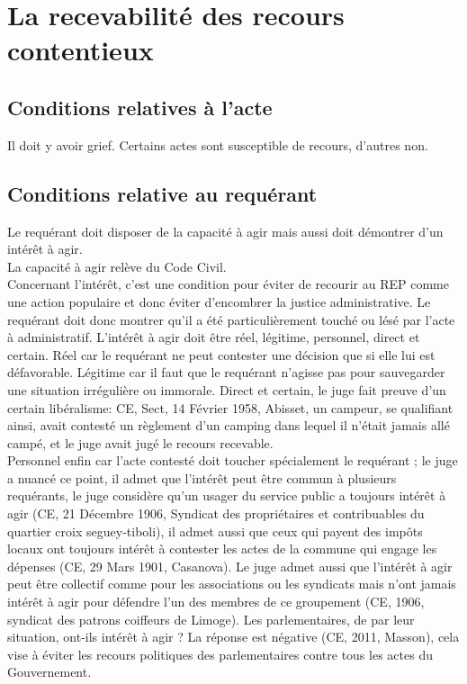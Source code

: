 \documentclass[10pt, a4paper, openany]{book}
\begin{document}
\chapter{La recevabilité des recours contentieux}

\section{Conditions relatives à l'acte}


Il doit y avoir grief. Certains actes sont susceptible de recours, d'autres non.

\section{Conditions relative au requérant}

Le requérant doit disposer de la capacité à agir mais aussi doit démontrer d'un intérêt à agir. \\
La capacité à agir relève du Code Civil. \\
Concernant l'intérêt, c'est une condition pour éviter de recourir au REP comme une action populaire et donc éviter d'encombrer la justice administrative. Le requérant doit donc montrer qu'il a été particulièrement touché ou lésé par l'acte à administratif. L'intérêt à agir doit être réel, légitime, personnel, direct et certain. Réel car le requérant ne peut contester une décision que si elle lui est défavorable. Légitime car il faut que le requérant n'agisse pas pour sauvegarder une situation irrégulière ou immorale. Direct et certain, le juge fait preuve d'un certain libéralisme: CE, Sect, 14 Février 1958, Abisset, un campeur, se qualifiant ainsi, avait contesté un règlement d'un camping dans lequel il n'était jamais allé campé, et le juge avait jugé le recours recevable. \\
Personnel enfin car l'acte contesté doit toucher spécialement le requérant ; le juge a nuancé ce point, il admet que l'intérêt peut être commun à plusieurs requérants, le juge considère qu'un usager du service public a toujours intérêt à agir (CE, 21 Décembre 1906, Syndicat des propriétaires et contribuables du quartier croix seguey-tiboli), il admet aussi que ceux qui payent des impôts locaux ont toujours intérêt à contester les actes de la commune qui engage les dépenses (CE, 29 Mars 1901, Casanova). Le juge admet aussi que l'intérêt à agir peut être collectif comme pour les associations ou les syndicats mais n'ont jamais intérêt à agir pour défendre l'un des membres de ce groupement (CE, 1906, syndicat des patrons coiffeurs de Limoge). Les parlementaires, de par leur situation, ont-ils intérêt à agir ? La réponse est négative (CE, 2011, Masson), cela vise à éviter les recours politiques des parlementaires contre tous les actes du Gouvernement.  
\end{document}
